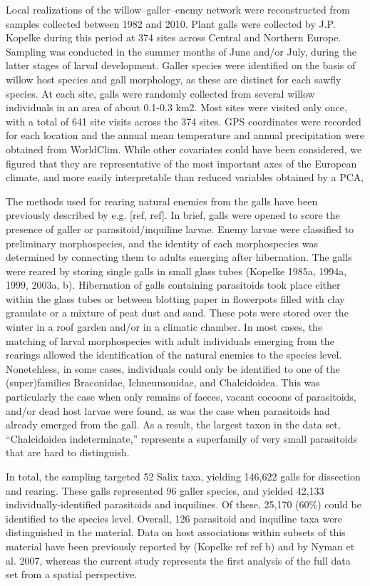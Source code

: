 \documentclass[12pt]{article}
\begin{document}
Local realizations of the willow–galler–enemy network were reconstructed from
samples collected between 1982 and 2010. Plant galls were collected by J.P.
Kopelke during this period at 374 sites across Central and Northern Europe.
Sampling was conducted in the summer months of June and/or July, during the
latter stages of larval development. Galler species were identified on the
basis of willow host species and gall morphology, as these are distinct for
each sawfly species. At each site, galls were randomly collected from several
willow individuals in an area of about 0.1-0.3 km2. Most sites were visited
only once, with a total of 641 site visits across the 374 sites. GPS
coordinates were recorded for each location and the annual mean temperature
and annual precipitation were obtained from WorldClim. While other covariates
could have been considered, we figured that they are representative of the
most important axes of the European climate, and more easily
interpretable than reduced variables obtained by a PCA,

The methods used for rearing natural enemies from the galls have been
previously described by e.g. [ref, ref]. In brief, galls were opened to score
the presence of galler or parasitoid/inquiline larvae. Enemy larvae were
classified to preliminary morphospecies, and the identity of each
morphospecies was determined by connecting them to adults emerging after
hibernation. The galls were reared by storing single galls in small glass
tubes (Kopelke 1985a, 1994a, 1999, 2003a, b). Hibernation of galls containing
parasitoids took place either within the glass tubes or between blotting paper
in flowerpots filled with clay granulate or a mixture of peat dust and sand.
These pots were stored over the winter in a roof garden and/or in a climatic
chamber. In most cases, the matching of larval morphospecies with adult
individuals emerging from the rearings allowed the identification of the
natural enemies to the species level. Nonetehless, in some cases, individuals
could only be identified to one of the (super)families Braconidae,
Ichneumonidae, and Chalcidoidea. This was particularly the case when only
remains of faeces, vacant cocoons of parasitoids, and/or dead host larvae were
found, as was the case when parasitoids had already emerged from the gall. As
a result, the largest taxon in the data set, “Chalcidoidea indeterminate,”
represents a superfamily of very small parasitoids that are hard to
distinguish.

In total, the sampling targeted 52 Salix taxa, yielding 146,622 galls for
dissection and rearing. These galls represented 96 galler species, and yielded
42,133 individually-identified parasitoids and inquilines. Of these, 25,170
(60\%) could be identified to the species level. Overall, 126 parasitoid and
inquiline taxa were distinguished in the material. Data on host associations
within subsets of this material have been previously reported by (Kopelke ref
ref b) and by Nyman et al. 2007, whereas the current study represents the
first analysis of the full data set from a spatial perspective.
\end{document}

